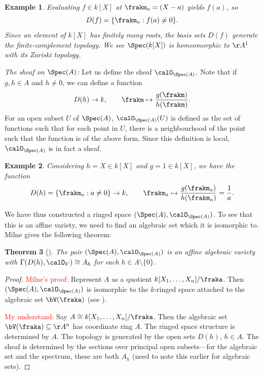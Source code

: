 \documentclass[12pt]{amsart}
\theoremstyle{plain}
\newtheorem{theorem}{Theorem}[subsection]
\newtheorem{example}[theorem]{Example}
\begin{document}
\begin{example}
Evaluating $f \in k[X]$ at $\frakm_a=(X-a)$ yields $f(a)$, so 
$$D(f) = \{\frakm_a : f(a) \ne 0\}.$$
Since an element of $k[X]$ has finitely many roots, the basis sets $D(f)$ generate the finite-complement topology.
We see $\Spec(k[X])$ is homeomorphic to $\AA^1$ with its Zariski topology.
\end{example}

\emph{The sheaf on $\Spec(A)$:}
Let us define the sheaf $\calO_{\Spec(A)}$.
Note that if $g, h\in A$ and $h \ne 0$, we can define a function
$$D(h) \to k, \qquad \frakm \mapsto \frac{g(\frakm)}{h(\frakm)}.$$
For an open subset $U$ of $\Spec(A)$, $\calO_{\Spec(A)}(U)$ is defined as the set of functions such that for each point in $U$, there is a neighbourhood of the point such that the function is of the above form.
Since this definition is local, $\calO_{\Spec(A)}$ is in fact a sheaf.

\begin{example}
Considering $h = X \in k[X]$ and $g=1\in k[X]$, we have the function 
$$D(h) =\{\frakm_a : a \ne 0\} \to k, \qquad \frakm_a \mapsto \frac{g(\frakm_a)}{h(\frakm_a)} = \frac{1}{a}.$$
\end{example}

We have thus constructed a ringed space $(\Spec(A), \calO_{\Spec(A)})$.
To see that this is an affine variety, we need to find an algebraic set which it is isomorphic to.
Milne gives the following theorem:

\begin{theorem}[{\cite[Proposition 3.22]{Milne13}}]
The pair $(\Spec(A), \calO_{\Spec(A)})$ is an affine algebraic variety with $\Gamma(D(h), \calO_V) \cong A_h$ for each $h \in A\setminus\{0\}$.
\end{theorem}
\begin{proof}
\textcolor{red}{Milne's proof:}
Represent $A$ as a quotient $k[X_1,\ldots,X_n]/\fraka$.
Then $(\Spec(A), \calO_{\Spec(A)})$ is isomorphic to the $k$-ringed space attached to the algebraic set $\bV(\fraka)$ (see \cite[3.15]{Milne13}).

\textcolor{red}{My understand:}
Say $A \cong k[X_1,\ldots,X_n]/\fraka$.
Then the algebraic set $\bV(\fraka) \subseteq \AA^n$ has coordinate ring $A$.
The ringed space structure is determined by $A$.
The topology is generated by the open sets $D(h)$, $h \in A$.
The sheaf is determined by the sections over principal open subsets---for the algebraic set and the spectrum, these are both $A_h$ (need to note this earlier for algebraic sets).
\end{proof}
\end{document}
